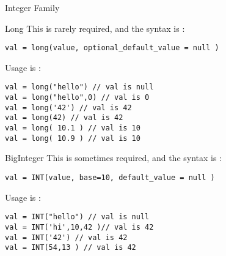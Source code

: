 \begin{section}{Integer Family}
\begin{subsection}{Long}
This is rarely required, and the syntax is :

\begin{lstlisting}[style=JexlStyle]
val = long(value, optional_default_value = null )
\end{lstlisting}

Usage is :

\begin{lstlisting}[style=JexlStyle]
val = long("hello") // val is null
val = long("hello",0) // val is 0
val = long('42') // val is 42 
val = long(42) // val is 42 
val = long( 10.1 ) // val is 10 
val = long( 10.9 ) // val is 10 
\end{lstlisting}

\end{subsection}

\begin{subsection}{BigInteger}
This is sometimes required, and the syntax is :

\begin{lstlisting}[style=JexlStyle]
val = INT(value, base=10, default_value = null )
\end{lstlisting}

Usage is :

\begin{lstlisting}[style=JexlStyle]
val = INT("hello") // val is null
val = INT('hi',10,42 )// val is 42
val = INT('42') // val is 42 
val = INT(54,13 ) // val is 42 
\end{lstlisting}

\end{subsection}
\end{section}


